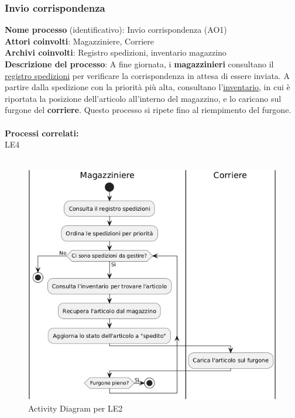 \documentclass[a4paper,12pt]{article}
\begin{document}
\subsubsection{Invio corrispondenza}
\textbf{Nome processo} (identificativo): Invio corrispondenza (AO1) \\
\textbf{Attori coinvolti}: Magazziniere, Corriere \\
\textbf{Archivi coinvolti}: Registro spedizioni, inventario magazzino \\
\textbf{Descrizione del processo}: A fine giornata, i \textbf{magazzinieri} consultano il \underline{registro spedizioni} per verificare la corrispondenza
in attesa di essere inviata. A partire dalla spedizione con la priorità più alta, consultano l'\underline{inventario}, in cui è riportata la posizione dell'articolo
all'interno del magazzino, e lo caricano sul furgone del \textbf{corriere}. Questo processo si ripete fino al riempimento del furgone. \\ \\
\textbf{Processi correlati:}\\LE4\\ \\
\begin{figure}[H]
  \centering
  \includegraphics[width=0.8\linewidth]{assets/activitydiagram_AO1.png}
	\caption{Activity Diagram per LE2}
\end{figure}
\end{document}
